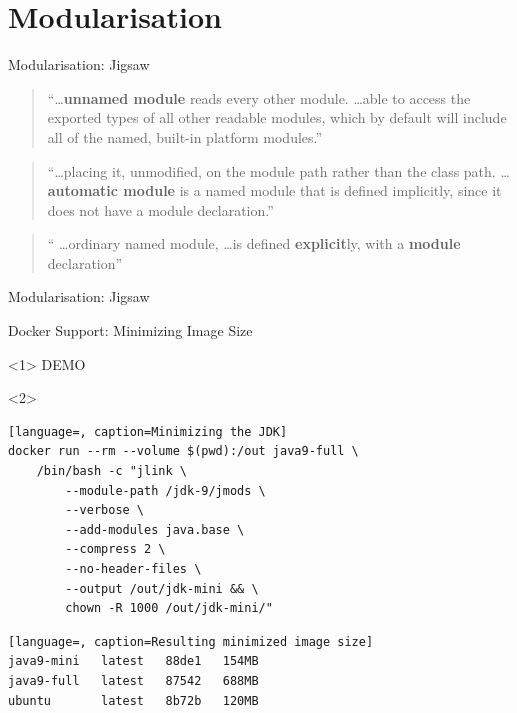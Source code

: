 \section{Modularisation}

\begin{frame}{Modularisation: Jigsaw}
	\begin{quote}
		\enquote{\dots \textbf{unnamed module} reads every other module. \dots able to access the exported types of all other readable modules, which by default will include all of the named, built-in platform modules.}
	\end{quote}
	\begin{quote}
		\enquote{\dots placing it, unmodified, on the module path rather than the class path. \dots \textbf{automatic module} is a named module that is defined implicitly, since it does not have a module declaration.}
	\end{quote}
	\begin{quote}
	\enquote{
		\dots ordinary named module, \dots is defined \textbf{explicit}ly, with a \textbf{module} declaration}
	\end{quote}
\end{frame}

\begin{frame}{Modularisation: Jigsaw}

\end{frame}

\begin{frame}[fragile]{Docker Support: Minimizing Image Size}
\begin{onlyenv}<1>
	\fontsize{20}{0}\selectfont
	\hfill DEMO \hfill
\end{onlyenv}
\begin{onlyenv}<2>
\begin{lstlisting}[language=, caption=Minimizing the JDK]
docker run --rm --volume $(pwd):/out java9-full \
    /bin/bash -c "jlink \
        --module-path /jdk-9/jmods \
        --verbose \
        --add-modules java.base \
        --compress 2 \
        --no-header-files \
        --output /out/jdk-mini && \
        chown -R 1000 /out/jdk-mini/"
\end{lstlisting}
\begin{lstlisting}[language=, caption=Resulting minimized image size]
java9-mini   latest   88de1   154MB
java9-full   latest   87542   688MB
ubuntu       latest   8b72b   120MB
\end{lstlisting}
\end{onlyenv}
\end{frame}

